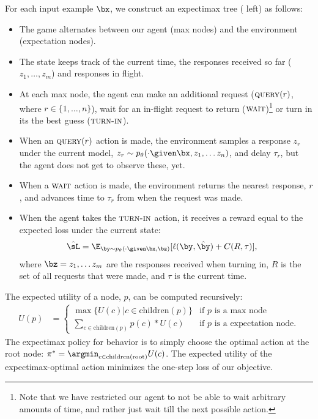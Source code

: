 For each input example $\bx$, we construct an expectimax tree ( left) as follows: 
\begin{itemize}
  \item The game alternates between our agent (max nodes) and the environment (expectation nodes).
  \item The state keeps track of the current time, the responses received so far ($z_1, \ldots, z_m$) and responses in flight.
  \item At each max node, the agent can make an additional request ($\operatorname{\textsc{query}}(r)$, where $r \in \{1, \ldots, n\}$), wait for an in-flight request to return ($\operatorname{\textsc{wait}}$)\footnote{Note that we have restricted our agent to not be able to wait arbitrary amounts of time, and rather just wait till the next possible action.} or turn in its the best guess ($\operatorname{\textsc{turn-in}}$).
  \item When an $\operatorname{\textsc{query}}(r)$ action is made, the environment samples a response $z_r$ under the current model, $z_r \sim \p(\cdot \given \bx, z_1, \dots z_n)$, and delay $\tau_r$, but the agent does not get to observe these, yet.
  \item When a $\operatorname{\textsc{wait}}$ action is made, the environment returns the nearest response, $r$, and advances time to $\tau_r$ from when the request was made.
  \item When the agent takes the $\operatorname{\textsc{turn-in}}$ action, it receives a reward equal to the expected loss under the current state:
      \begin{align*}
        \hat\sL &= \E_{\by \sim \p(\cdot \given \bx, \bz)}[\ell(\by, \byt) + C(R, \tau)],
      \end{align*}
  where $\bz = z_1, \dots z_m$ are the responses received when turning in, $R$ is the set of all requests that were made, and $\tau$ is the current time.
\end{itemize}

The expected utility of a node, $p$, can be computed recursively:
\begin{align*}
  U(p) &= 
  \begin{cases}
    \max\{ U(c) | c \in \textrm{children}(p) \} & \textrm{if $p$ is a max node} \\
    \sum_{c \in \textrm{children}(p)} p(c) * U(c) & \textrm{if $p$ is a expectation node}.
  \end{cases}
\end{align*}
The expectimax policy for behavior is to simply choose the optimal action at the root node: $\pi^* = \argmin_{c \in \textrm{children}(\textrm{root})} U(c)$.
The expected utility of the expectimax-optimal action minimizes the one-step loss of our objective.


